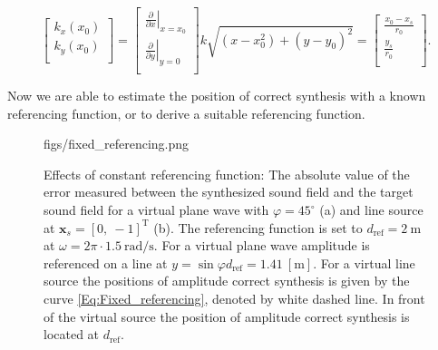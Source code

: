 \documentclass[12pt,a4paper]{article}
\newcommand{\sinfi}{\sin\varphi}
\newcommand{\dref}{d_{\mathrm{ref}}}
\begin{document}
\begin{itemize}
\begin{equation}
\begin{bmatrix} k_x(x_0) \\[0.3em] k_y(x_0)\\[0.3em]    \end{bmatrix} = 
\begin{bmatrix} 
\left. \frac{\partial}{\partial x} \right|_{x = x_0} 
\\[0.3em] 
\left. \frac{\partial}{\partial y} \right|_{y = 0} 
\\[0.3em]    \end{bmatrix} 
k\sqrt{(x-x_0^2) + (y-y_0)^2} = 
\begin{bmatrix} 
\frac{x_0- x_s}{r_0}
\\[0.3em] 
\frac{y_s}{r_0}
\\[0.3em]    \end{bmatrix} 
.
\end{equation}
\end{itemize}

Now we are able to estimate the position of correct synthesis with a known referencing function, or to derive a suitable referencing function.

\begin{figure}
	\centering
	\begin{overpic}[width = 1\columnwidth ]{figs/fixed_referencing.png}
	\scriptsize
	\end{overpic}
\caption{ Effects of constant referencing function: The absolute value of the error measured between the synthesized sound field and the target sound field for a virtual plane wave with $\varphi = 45^{\circ}$ (a) and line source at $\mathbf{x}_s = [0,\ -1]^{\mathrm{T}}$ (b). The referencing function is set to $\dref = 2~\mathrm{m}$ at $\omega = 2\pi\cdot 1.5~\mathrm{rad/s}$. For a virtual plane wave amplitude is referenced on a line at $y = \sinfi \dref = 1.41~[\mathrm{m}]$. For a virtual line source the positions of amplitude correct synthesis is given by the curve \eqref{Eq:Fixed_referencing}, denoted by white dashed line. In front of the virtual source the position of amplitude correct synthesis is located at $\dref$. }
	\label{Fig:Theory:fixed_referencing}
\end{figure}
\end{document}
